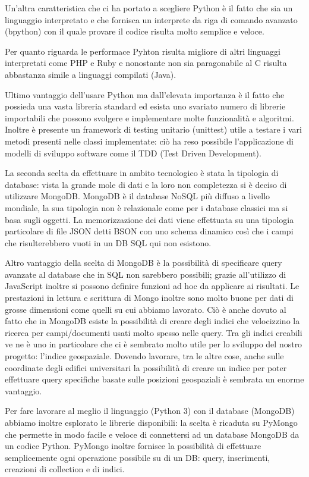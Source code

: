 \documentclass[12pt]{report}
\begin{document}
Un'altra caratteristica che ci ha portato a scegliere Python è il fatto che sia un linguaggio interpretato e che fornisca un interprete da riga di comando avanzato (bpython) con il quale provare il codice risulta molto semplice e veloce. 

Per quanto riguarda le performace Pyhton risulta migliore di altri linguaggi interpretati come PHP e Ruby e nonostante non sia paragonabile al C risulta abbastanza simile a linguaggi compilati (Java).

Ultimo vantaggio dell'usare Python ma dall'elevata importanza è il fatto che possieda una vasta libreria standard ed esista uno svariato numero di librerie importabili che possono svolgere e implementare molte funzionalità e algoritmi. Inoltre è presente un framework di testing unitario (unittest) utile a testare i vari metodi presenti nelle classi implementate: ciò ha reso possibile l'applicazione di modelli di sviluppo software come il TDD (Test Driven Development).

La seconda scelta da effettuare in ambito tecnologico è stata la tipologia di database: vista la grande mole di dati e la loro non completezza si è deciso di utilizzare MongoDB. MongoDB è il database NoSQL più diffuso a livello mondiale, la sua tipologia non è relazionale come per i database classici ma si basa sugli oggetti. La memorizzazione dei dati viene effettuata su una tipologia particolare di file JSON detti BSON con uno schema dinamico così che i campi che risulterebbero vuoti in un DB SQL qui non esistono. 

Altro vantaggio della scelta di MongoDB è la possibilità di specificare query avanzate al database che in SQL non sarebbero possibili; grazie all'utilizzo di JavaScript inoltre si possono definire funzioni ad hoc da applicare ai risultati. Le prestazioni in lettura e scrittura di Mongo inoltre sono molto buone per dati di grosse dimensioni come quelli su cui abbiamo lavorato. Ciò è anche dovuto al fatto che in MongoDB esiste la possibilità di creare degli indici che velocizzino la ricerca per campi/documenti usati molto spesso nelle query. Tra gli indici creabili ve ne è uno in particolare che ci è sembrato molto utile per lo sviluppo del nostro progetto: l'indice geospaziale. Dovendo lavorare, tra le altre cose, anche sulle coordinate degli edifici universitari la possibilità di creare un indice per poter effettuare query specifiche basate sulle posizioni geospaziali è sembrata un enorme vantaggio.

Per fare lavorare al meglio il linguaggio (Python 3) con il database (MongoDB) abbiamo inoltre esplorato le librerie disponibili: la scelta è ricaduta su PyMongo che permette in modo facile e veloce di connettersi ad un database MongoDB da un codice Python. PyMongo inoltre fornisce la possibilità di effettuare semplicemente ogni operazione possibile su di un DB: query, inserimenti, creazioni di collection e di indici. 
 
\end{document}
